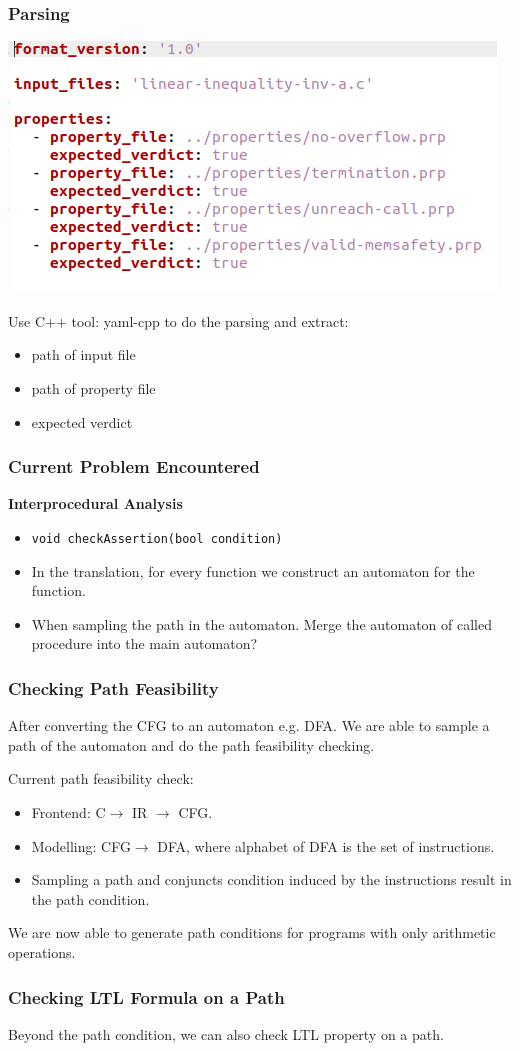 \documentclass[11pt]{beamer}
\begin{document}
\begin{frame}\frametitle{Parsing}
\begin{center}
\includegraphics[scale=0.4]{yaml.png}
\end{center}
Use C++ tool: yaml-cpp to do the parsing and extract:
\begin{itemize}
\item path of input file
\item path of property file
\item expected verdict 
\end{itemize}
\end{frame}
\begin{frame}\frametitle{Current Problem Encountered}
\textbf{Interprocedural Analysis}
\begin{itemize}
\item \texttt{void checkAssertion(bool condition)}

\item In the translation, for every function we construct an automaton for the function. 

\item When sampling the path in the automaton.
Merge the automaton of called procedure into the main automaton?


\end{itemize}

\end{frame}

\begin{frame}\frametitle{Checking Path Feasibility}

After converting the CFG to an automaton e.g. DFA. We are able to sample a path of the automaton and do the path feasibility checking.
 
Current path feasibility check:
\begin{itemize}
\item Frontend: C$\rightarrow$ IR $\rightarrow$ CFG.
\item Modelling: CFG$\rightarrow$ DFA, where alphabet of DFA is the set of instructions.

\item Sampling a path and conjuncts condition induced by the instructions result in the path condition.
\end{itemize}

We are now able to generate path conditions for programs with only arithmetic operations. 
\end{frame}

\begin{frame}\frametitle{Checking LTL Formula on a Path}
Beyond the path condition, we can also check LTL property on a path. 
\end{frame}
\end{document}
